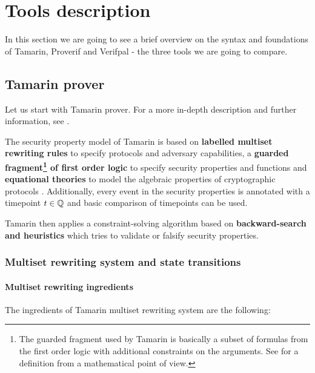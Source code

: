 
\section{Tools description}
\label{section:foundations}

In this section we are going to see a brief overview on the syntax and foundations of Tamarin, Proverif and Verifpal - the three tools we are going to compare.


\subsection{Tamarin prover}
Let us start with Tamarin prover. For a more
in-depth description and further information, see \cite{TamarinFoundations, TamarinFoundationsExtended, TamarinManual}.

The security property model of Tamarin is based on \textbf{labelled multiset rewriting rules} to specify protocols and adversary capabilities, a \textbf{guarded fragment\footnote{The guarded fragment used by Tamarin is basically a subset of formulas from the first order logic with additional constraints on the arguments. See \cite{FragmentFirstOrderLogicPaper} for a definition from a mathematical point of view.} of first order logic} to specify security properties and functions and \textbf{equational theories} to model the algebraic properties of cryptographic protocols \cite{TamarinFoundations}. Additionally, every event in the security properties is annotated with a timepoint $t \in \mathbb{Q}$ and basic comparison of timepoints can be used.

Tamarin then applies a constraint-solving algorithm based on \textbf{backward-search and heuristics} which tries to validate or falsify security properties.

\subsubsection{Multiset rewriting system and state transitions}

\paragraph{Multiset rewriting ingredients} The ingredients of Tamarin multiset rewriting system are the following:

